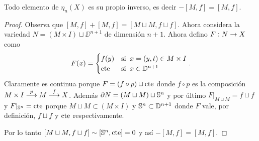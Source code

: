 \begin{ejercicio}\label{ej:38}
  Todo elemento de $\eta_n(X)$ es su propio inverso, es decir $-[M,f]=[M,f]$.
\end{ejercicio}
\begin{proof}%
  Observa que $[M,f]+[M,f]=[M\sqcup M,f\sqcup f]$. Ahora considera la variedad
  $N=(M\times I)\sqcup\DD^{n+1}$ de dimensi\'on $n+1$. Ahora defino $F:N\rightarrow X$ como
  \[
    F(x)=
    \begin{cases}
      f(y) &\text{si}\;\; x=(y,t)\in M\times I \\
      \text{cte} &\text{si}\;\; x\in\mathbb{D}^{n+1}
    \end{cases}.
  \]
  Claramente es continua porque $F=(f\circ p)\sqcup\text{cte}$ donde $f\circ p$ es la
  composici\'on $M\times I \overset{p}{\longrightarrow} M \overset{f}{\longrightarrow} X$. Adem\'as $\partial N= (M\sqcup M) \sqcup \mathbb{S}^n$
  y por \'ultimo $F|_{M\sqcup M}=f\sqcup f$ y $F|_{\mathbb{S}^n}=\text{cte}$ porque $M\sqcup M\subset (M\times I)$
  y $\mathbb{S}^n\subset\mathbb{D}^{n+1}$ donde $F$ vale, por definici\'on, $f\sqcup f$ y $\text{cte}$ respectivamente.

  Por lo tanto $[M\sqcup M,f\sqcup f]\sim[\mathbb{S}^n,\text{cte}]=0$ y as\'i $-[M,f]=[M,f]$.
\end{proof}%

